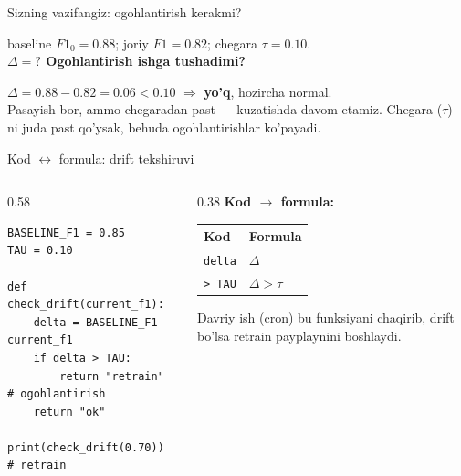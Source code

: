 \documentclass[aspectratio=169,11pt]{beamer}
\begin{document}
\begin{frame}{Sizning vazifangiz: ogohlantirish kerakmi?}
  \begin{tcolorbox}[warnbox,title=Savol --- 60 soniya]
    \small
    baseline $F1_0 = 0.88$; joriy $F1 = 0.82$; chegara $\tau = 0.10$.\\[4pt]
    \textbf{$\Delta = ?$ \quad Ogohlantirish ishga tushadimi?}
  \end{tcolorbox}
  \pause
  \begin{tcolorbox}[okbox,title=Javob]
    \small
    $\Delta = 0.88 - 0.82 = 0.06 < 0.10$ $\Rightarrow$ \textbf{yo'q}, hozircha normal.\\[3pt]
    \footnotesize Pasayish bor, ammo chegaradan past --- kuzatishda davom etamiz.
    Chegara ($\tau$) ni juda past qo'ysak, behuda ogohlantirishlar ko'payadi.
  \end{tcolorbox}
\end{frame}

\begin{frame}[fragile]{Kod $\leftrightarrow$ formula: drift tekshiruvi}
  \begin{columns}[T]
    \begin{column}{0.58\textwidth}
\begin{lstlisting}
BASELINE_F1 = 0.85
TAU = 0.10

def check_drift(current_f1):
    delta = BASELINE_F1 - current_f1
    if delta > TAU:
        return "retrain"      # ogohlantirish
    return "ok"

print(check_drift(0.70))      # retrain
\end{lstlisting}
    \end{column}
    \begin{column}{0.38\textwidth}
      \textbf{Kod $\to$ formula:}\\[3pt]
      \footnotesize
      \begin{tabular}{p{1.7cm}p{2.0cm}}
        \toprule
        Kod & Formula \\
        \midrule
        \texttt{delta} & $\Delta$ \\
        \texttt{> TAU} & $\Delta>\tau$ \\
        \bottomrule
      \end{tabular}
      \vspace{4pt}
      \begin{tcolorbox}[okbox,top=2pt,bottom=2pt]
        \footnotesize
        Davriy ish (cron) bu funksiyani chaqirib, drift bo'lsa retrain
        payplaynini boshlaydi.
      \end{tcolorbox}
    \end{column}
  \end{columns}
\end{frame}
\end{document}
